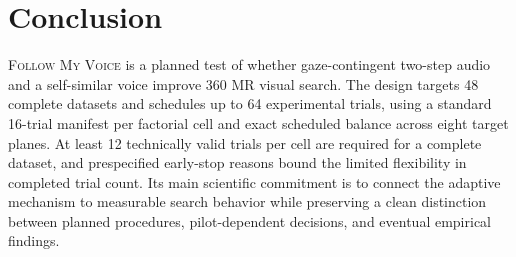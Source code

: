 \documentclass[10pt,journal,compsoc]{IEEEtran}
\newcommand{\system}{\textsc{Follow My Voice}}
\begin{document}
\section{Conclusion}
\system{} is a planned test of whether gaze-contingent two-step audio and a self-similar voice improve 360\textdegree{} MR visual search. The design targets 48 complete datasets and schedules up to 64 experimental trials, using a standard 16-trial manifest per factorial cell and exact scheduled balance across eight target planes. At least 12 technically valid trials per cell are required for a complete dataset, and prespecified early-stop reasons bound the limited flexibility in completed trial count. Its main scientific commitment is to connect the adaptive mechanism to measurable search behavior while preserving a clean distinction between planned procedures, pilot-dependent decisions, and eventual empirical findings.



\end{document}

